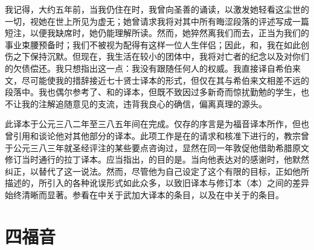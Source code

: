 \par

我记得，大约五年前，当我仍住在时，我曾向圣善的诵读，以激发她轻看这尘世的一切，视她在世上所见为虚无；她曾请求我将对其中所有晦涩段落的评述写成一篇短注，以便我缺席时，她仍能理解所读。然而，她猝然离我们而去，正当为我们的事业束腰预备时；我们不被视为配得有这样一位人生伴侣；因此，和，我在如此创伤之下保持沉默。但现在，我生活在较小的团体中，我将对亡者的纪念以及对你们的欠债偿还。我只想指出这一点：我没有跟随任何人的权威。我直接译自希伯来文，尽可能使我的措辞接近七十贤士译本的形式，但仅在其与希伯来文相差不远的段落中。我也偶尔参考了、和的译本，但既不致因过多新奇而惊扰勤勉的学生，也不让我的注解追随意见的支流，违背我良心的确信，偏离真理的源头。\par


此译本于公元三八二年至三八五年间在完成。仅存的序言是为福音译本所作，但也曾引用和谈论他对其他部分的译本。此项工作是在的请求和核准下进行的，教宗曾于公元三八三年就圣经评注的某些要点咨询过，显然在同一年敦促他借助希腊原文修订当时通行的拉丁译本。应当指出，的目的是。当向他表达对的感谢时，他默然纠正，以替代了这一说法。然而，尽管他为自己设定了这个有限的目标，正如他所描述的，所引入的各种讹误形式如此众多，以致旧译本与修订本（本）之间的差异始终清晰而显著。参看在中关于武加大译本的条目，以及在中关于的条目。\par


\section{四福音}

\par

